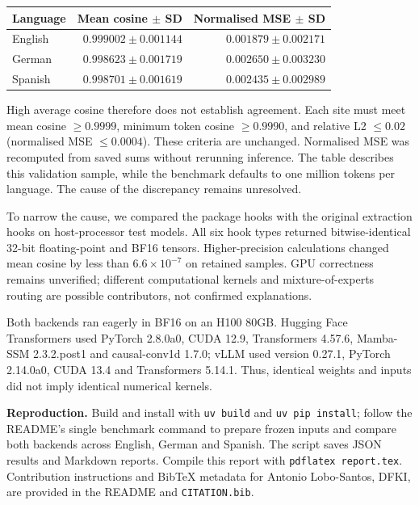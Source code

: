 \documentclass[10pt,a4paper]{article}
\begin{document}
\begin{center}
\begin{tabular}{lrr}
\toprule
Language & Mean cosine $\pm$ SD & Normalised MSE $\pm$ SD \\
\midrule
English & $0.999002 \pm 0.001144$ & $0.001879 \pm 0.002171$ \\
German  & $0.998623 \pm 0.001719$ & $0.002650 \pm 0.003230$ \\
Spanish & $0.998701 \pm 0.001619$ & $0.002435 \pm 0.002989$ \\
\bottomrule
\end{tabular}
\end{center}
High average cosine therefore does not establish agreement. Each site must meet
mean cosine $\geq0.9999$, minimum token cosine $\geq0.9990$, and relative L2
$\leq0.02$ (normalised MSE $\leq0.0004$). These criteria are unchanged.
Normalised MSE was recomputed from saved sums without rerunning inference.
The table describes this validation sample, while the benchmark defaults to
one million tokens per language. The cause of the discrepancy remains unresolved.

To narrow the cause, we compared the package hooks with the original extraction
hooks on host-processor test models. All six hook types returned bitwise-identical 32-bit floating-point
and BF16 tensors. Higher-precision calculations changed mean cosine by less than
$6.6\times10^{-7}$ on retained samples. GPU correctness remains unverified;
different computational kernels and mixture-of-experts routing are possible
contributors, not confirmed explanations.

Both backends ran eagerly in BF16 on an H100 80GB. Hugging Face Transformers used PyTorch 2.8.0a0,
CUDA 12.9, Transformers 4.57.6, Mamba-SSM 2.3.2.post1 and causal-conv1d 1.7.0;
vLLM used version 0.27.1, PyTorch 2.14.0a0, CUDA 13.4 and Transformers 5.14.1.
Thus, identical weights and inputs did not imply identical numerical kernels.

\textbf{Reproduction.}
Build and install with \texttt{uv build} and \texttt{uv pip install}; follow the
README's single benchmark command to prepare frozen inputs and compare both
backends across English, German and Spanish. The script saves JSON results and
Markdown reports. Compile this report with \texttt{pdflatex report.tex}.
Contribution instructions and BibTeX metadata for Antonio Lobo-Santos, DFKI,
are provided in the README and \texttt{CITATION.bib}.
\end{document}
